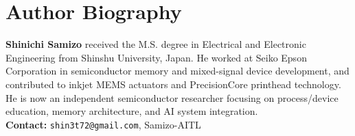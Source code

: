 \documentclass[conference]{IEEEtran}
\begin{document}
\section*{Author Biography}
\textbf{Shinichi Samizo} received the M.S. degree in Electrical and Electronic Engineering from Shinshu University, Japan.
He worked at Seiko Epson Corporation in semiconductor memory and mixed-signal device development, and contributed to inkjet MEMS actuators and PrecisionCore printhead technology. He is now an independent semiconductor researcher focusing on process/device education, memory architecture, and AI system integration.\\
\textbf{Contact:} \texttt{shin3t72@gmail.com}, Samizo-AITL
\end{document}
